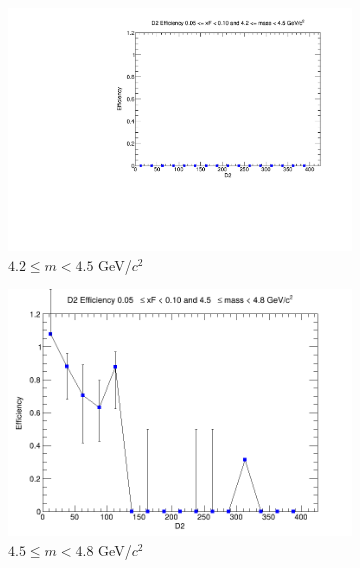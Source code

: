 \begin{figure}[p]
    \centering
    \begin{subfigure}[b]{0.32\textwidth}
        \centering
        \includegraphics[width=\textwidth]{./kTrackerEfficiencyPlots/D2_Efficiency_xF1_mass0.pdf}
        \caption{$4.2 \leq m < 4.5$ GeV/$c^2$}
        \label{fig:xF1_mass0}
    \end{subfigure}
    \hfill
    \begin{subfigure}[b]{0.32\textwidth}
        \centering
        \includegraphics[width=\textwidth]{./kTrackerEfficiencyPlots/D2_Efficiency_xF1_mass1.png}
        \caption{$4.5 \leq m < 4.8$ GeV/$c^2$}
        \label{fig:xF1_mass1}
    \end{subfigure}
    \hfill
    \begin{subfigure}[b]{0.32\textwidth}

\end{subfigure}
\end{figure}
